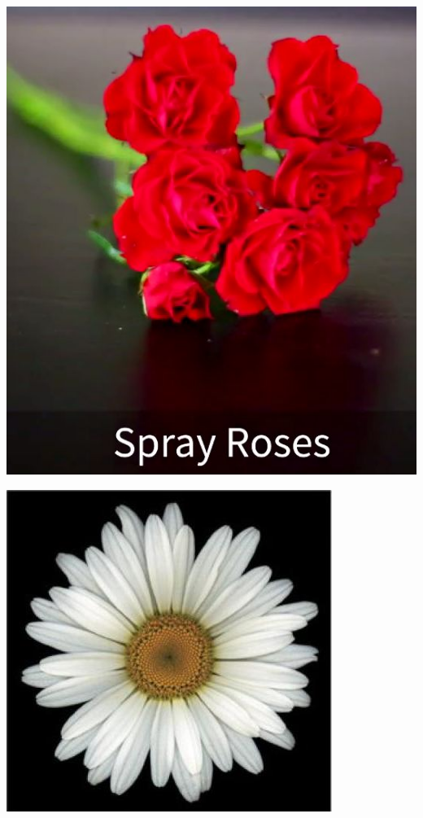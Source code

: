 \documentclass{article}
\begin{document}
\begin{center}
\includegraphics[width=0.9\textheight, angle=90]{../Rose_Spray.jpg}
\end{center}
\newpage

\begin{center}
\includegraphics[width=0.9\textheight, angle=90]{../ShastaDaisy.jpg}
\end{center}
\newpage
\end{document}
